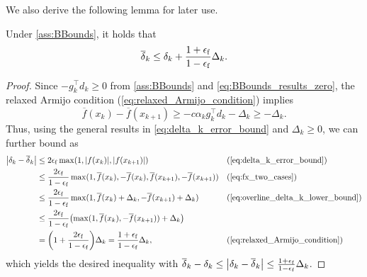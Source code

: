 \documentclass[journal_revised_MPC]{subfiles}
\begin{document}
We also derive the following lemma for later use.
\begin{lemma}\label{lem:error_delta_bounded_by_Delta}
    Under \cref{ass:BBounds}, it holds that
    \begin{equation*}
        \overline{\delta}_k \leq \delta_k + \frac{1 + \epsilon_\mathrm{f}}{1 - \epsilon_\mathrm{f}} \Delta_k.
    \end{equation*}
\end{lemma}
\begin{proof}
    Since $-g_k^\top d_k \geq 0$ from \cref{ass:BBounds} and \cref{eq:BBounds_results_zero}, the relaxed Armijo condition (\cref{eq:relaxed_Armijo_condition}) implies
    \begin{equation}\label{eq:overline_delta_k_lower_bound}
        \overline{f}(x_k) - \overline{f}(x_{k+1})
        \geq - c \alpha_k g_k^\top d_k -\Delta_k
        \geq -\Delta_k.
    \end{equation}
    Thus, using the general results in \cref{eq:delta_k_error_bound} and $\Delta_k \geq 0$, we can further bound as
    \begin{align*}
        \abs{\delta_k - \overline{\delta}_k} & \leq 2\feps \max(1,\abs{f(x_k)},\abs{f(x_{k+1})})                                                                                 &  & (\text{\cref{eq:delta_k_error_bound}})          \\
                                             & \leq \frac{2\feps}{1-\feps} \max(1, \overline{f}(x_{k}), -\overline{f}(x_{k}), \overline{f}(x_{{k}+1}), -\overline{f}(x_{{k}+1})) &  & (\text{\cref{eq:fx_two_cases}})                 \\
                                             & \le \frac{2\feps}{1-\feps} \max(1, \overline{f}(x_{k}) + \Delta_{k}, -\overline{f}(x_{{k}+1}) + \Delta_{k})                       &  & (\text{\cref{eq:overline_delta_k_lower_bound}}) \\
                                             & \le \frac{2\feps}{1-\feps} \qty(\max(1, \overline{f}(x_{k}), -\overline{f}(x_{{k}+1})) + \Delta_k)                                                                                     \\
                                             & = \qty(1 + \frac{2\feps}{1-\feps}) \Delta_k  = \frac{1 + \feps}{1 - \feps} \Delta_k,                                              &  & (\text{\cref{eq:relaxed_Armijo_condition}})
    \end{align*}
    which yields the desired inequality with $\overline{\delta}_k - \delta_k \leq \abs{\delta_k - \overline{\delta}_k} \leq \frac{1 + \epsilon_\mathrm{f}}{1 - \epsilon_\mathrm{f}} \Delta_k$.
    \myQED
\end{proof}
\end{document}
